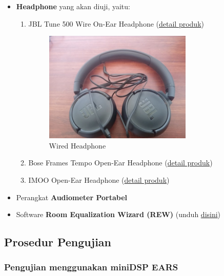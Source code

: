 \documentclass{article}
\begin{document}
\begin{itemize}
		\item \textbf{Headphone} yang akan diuji, yaitu:
		\begin{enumerate}
			\item JBL Tune 500 Wire On-Ear Headphone 
			(\href{https://id.jbl.com/over-ear-headphones/JBL+TUNE500.html}{detail produk})
			\begin{figure}[H]
				\centering
				\includegraphics[width=200pt]{images/unit/jbl}
				\caption{Wired Headphone}
			\end{figure}
			
			\item Bose Frames Tempo Open-Ear Headphone
			(\href{https://www.bose.com/en_us/products/frames/bose-frames-tempo.html#v=bose_frames_tempo_black_us}{detail produk})
			\item IMOO Open-Ear Headphone
			(\href{https://imoostore.com/pages/imoo-ear-care-headset}{detail produk})
		\end{enumerate}
	
		\item Perangkat {\bf Audiometer Portabel}
		
		\item Software \textbf{Room Equalization Wizard (REW)} (unduh \href{https://www.roomeqwizard.com/}{disini})
	\end{itemize}
	
	\subsection{Prosedur Pengujian}
	\subsubsection{Pengujian menggunakan miniDSP EARS}
\end{document}

